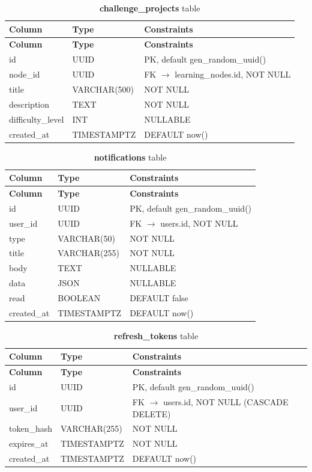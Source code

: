 \begin{longtable}{p{3cm}p{2.5cm}p{5cm}}
\caption{\textbf{challenge\_projects} table}
\label{tab:ch04_challenge_projects}\\
\toprule
\textbf{Column} & \textbf{Type} & \textbf{Constraints} \\
\midrule
\endfirsthead
\toprule
\textbf{Column} & \textbf{Type} & \textbf{Constraints} \\
\midrule
\endhead
id & UUID & PK, default gen\_random\_uuid() \\
node\_id & UUID & FK $\rightarrow$ learning\_nodes.id, NOT NULL \\
title & VARCHAR(500) & NOT NULL \\
description & TEXT & NOT NULL \\
difficulty\_level & INT & NULLABLE \\
created\_at & TIMESTAMPTZ & DEFAULT now() \\
\bottomrule
\end{longtable}

\begin{longtable}{p{3cm}p{2.5cm}p{5cm}}
\caption{\textbf{notifications} table}
\label{tab:ch04_notifications}\\
\toprule
\textbf{Column} & \textbf{Type} & \textbf{Constraints} \\
\midrule
\endfirsthead
\toprule
\textbf{Column} & \textbf{Type} & \textbf{Constraints} \\
\midrule
\endhead
id & UUID & PK, default gen\_random\_uuid() \\
user\_id & UUID & FK $\rightarrow$ users.id, NOT NULL \\
type & VARCHAR(50) & NOT NULL \\
title & VARCHAR(255) & NOT NULL \\
body & TEXT & NULLABLE \\
data & JSON & NULLABLE \\
read & BOOLEAN & DEFAULT false \\
created\_at & TIMESTAMPTZ & DEFAULT now() \\
\bottomrule
\end{longtable}

\begin{longtable}{p{3cm}p{2.5cm}p{5cm}}
\caption{\textbf{refresh\_tokens} table}
\label{tab:ch04_refresh_tokens}\\
\toprule
\textbf{Column} & \textbf{Type} & \textbf{Constraints} \\
\midrule
\endfirsthead
\toprule
\textbf{Column} & \textbf{Type} & \textbf{Constraints} \\
\midrule
\endhead
id & UUID & PK, default gen\_random\_uuid() \\
user\_id & UUID & FK $\rightarrow$ users.id, NOT NULL (CASCADE DELETE) \\
token\_hash & VARCHAR(255) & NOT NULL \\
expires\_at & TIMESTAMPTZ & NOT NULL \\
created\_at & TIMESTAMPTZ & DEFAULT now() \\
\bottomrule
\end{longtable}

